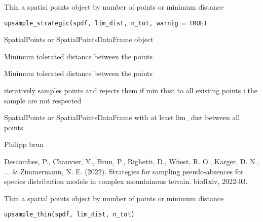 \documentclass[a4paper]{book}
\begin{document}
%
\begin{Description}\relax
Thin a spatial points object by number of points or minimum distance
\end{Description}
%
\begin{Usage}
\begin{verbatim}
upsample_strategic(spdf, lim_dist, n_tot, warnig = TRUE)
\end{verbatim}
\end{Usage}
%
\begin{Arguments}
\begin{ldescription}
\item[\code{spdf}] SpatialPoints or SpatialPointsDataFrame object

\item[\code{lim\_dist}] Minimum tolerated distance between the points

\item[\code{n\_tot}] Minimum tolerated distance between the points
\end{ldescription}
\end{Arguments}
%
\begin{Details}\relax
iteratively samples points and rejects them if min thist
to all existing points i the sample are not respected
\end{Details}
%
\begin{Value}
SpatialPoints or SpatialPointsDataFrame with at least
lim\_dist between all points
\end{Value}
%
\begin{Author}\relax
Philipp brun
\end{Author}
%
\begin{References}\relax
Descombes, P., Chauvier, Y., Brun, P., Righetti, D., Wüest, R. O., Karger, D. N., ... \&
Zimmermann, N. E. (2022). Strategies for sampling pseudo-absences for species distribution
models in complex mountainous terrain. bioRxiv, 2022-03.
\end{References}
%
\begin{Description}\relax
Thin a spatial points object by number of points or minimum distance
\end{Description}
%
\begin{Usage}
\begin{verbatim}
upsample_thin(spdf, lim_dist, n_tot)
\end{verbatim}
\end{Usage}
\end{document}
